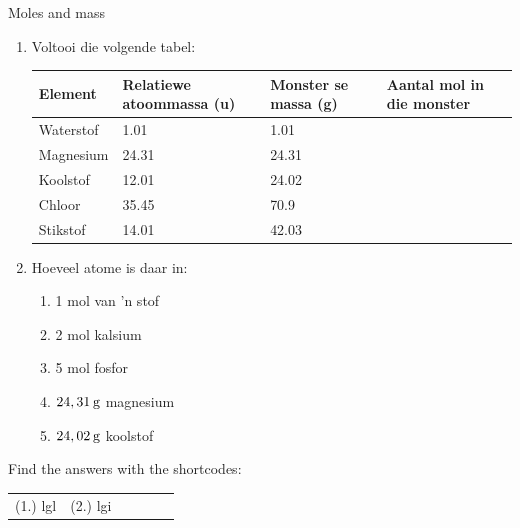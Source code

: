             \begin{exercises}{Moles and mass }
            \nopagebreak
      \label{m38717*id276067}\begin{enumerate}[noitemsep, label=\textbf{\arabic*}. ] 
\item Voltooi die volgende tabel:
          \begin{table}[H]
        \begin{center}
      \label{m38717*id276082}
    \noindent
      \begin{tabular}{|l|l|l|l|}\hline
\textbf{Element} & \textbf{Relatiewe atoommassa (u)} & \textbf{Monster se massa (g)} & \textbf{Aantal mol in die monster} \\ \hline
        Waterstof & 1.01 & 1.01 & \\ \hline
        Magnesium & 24.31 & 24.31 & \\ \hline
        Koolstof & 12.01 & 24.02 & \\ \hline
        Chloor & 35.45 & 70.9 & \\ \hline
        Stikstof & 14.01 & 42.03 & \\ \hline
    \end{tabular}
      \end{center}
\end{table}
    \par
          \label{m38717*uid3}\item 
Hoeveel atome is daar in:
\label{m38717*id276311}\begin{enumerate}[noitemsep, label=\textbf{\alph*}. ] 
            \label{m38717*uid4}\item 1 mol van  'n stof
\label{m38717*uid5}\item 2 mol kalsium
\label{m38717*uid6}\item 5 mol fosfor
\label{m38717*uid7}\item $24,31\phantom{\rule{2pt}{0ex}}\text{g}$ magnesium
\label{m38717*uid8}\item $24,02\phantom{\rule{2pt}{0ex}}\text{g}$ koolstof
\end{enumerate}
                \end{enumerate}
    \label{m38717*cid3}
\par {} Find the answers with the shortcodes:
 \par \begin{tabular}[h]{cccccc}
 (1.) lgl  &  (2.) lgi  & \end{tabular}
\end{exercises}
